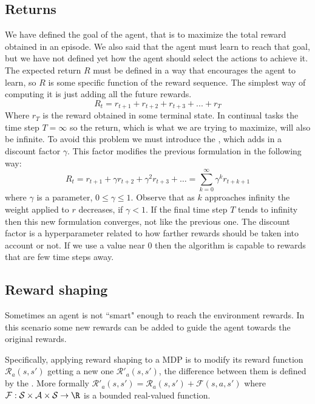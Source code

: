 \subsection{Returns\label{subsec:returns}}

We have defined the goal of the agent, that is to maximize the total reward obtained in an episode. We also said that the agent must learn to reach that goal, but we have not defined yet how the agent should select the actions to achieve it. The expected return $R$ must be defined in a way that encourages the agent to learn, so $R$ is some specific function of the reward sequence. The simplest way of computing it is just adding all the future rewards.
\begin{equation}
    R_t=r_{t+1}+r_{t+2}+r_{t+3}+...+r_T
\end{equation}
Where $r_T$ is the reward obtained in some terminal state. In continual tasks the
time step $T = \infty$ so the return, which is what we are trying to maximize, will also be infinite. To avoid this problem we must introduce
the , which adds in a discount factor $\gamma$. This factor modifies the previous formulation in the following way:
\begin{equation}
    R_t = r_{t+1} + \gamma r_{t+2} + \gamma^2 r_{t+3} + \dots = \sum_{k=0}^\infty\gamma^k r_{t+k+1}
\end{equation}
where $\gamma$ is a parameter, $0 \leq \gamma \leq 1$. Observe that as $k$ approaches infinity
the weight applied to $r$ decreases, if $\gamma < 1$. If the final time step $T$ tends to infinity
then this new formulation converges, not like the previous one. The discount factor is a hyperparameter
related to how farther rewards should be taken into account or not. If we use a value near 0 then the algorithm
is capable to rewards that are few time steps away.

\subsection{Reward shaping}

Sometimes an agent is not ``smart" enough to reach the environment rewards. In this scenario some new rewards can be added to guide the agent towards the original rewards.

Specifically, applying reward shaping to a \ac{MDP} is to modify its reward function $\mathcal{R}_a(s,s')$ getting a new one $\mathcal{R'}_a(s,s')$, the difference between them is defined by the
. More formally
$\mathcal{R'}_a(s,s') = \mathcal{R}_a(s,s') + \mathcal{F}(s,a,s')$ where
$\mathcal{F} : \mathcal{S} \times \mathcal{A} \times \mathcal{S} \rightarrow \R$ is a bounded real-valued function.

